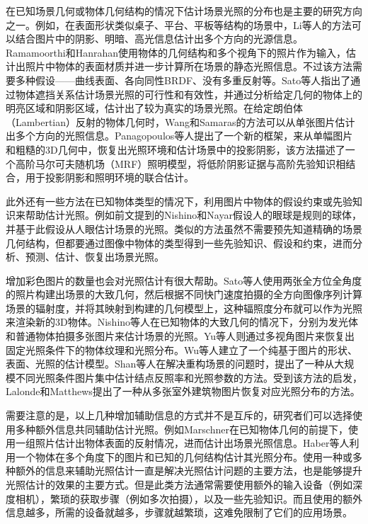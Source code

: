 
在已知场景几何或物体几何结构的情况下估计场景光照的分布也是主要的研究方向之一。例如，在表面形状类似桌子、平台、平板等结构的场景中，Li等人\cite{li2003multiple}的方法可以结合图片中的阴影、明暗、高光信息估计出多个方向的光源信息。Ramamoorthi和Hanrahan\cite{ramamoorthi2001signal}使用物体的几何结构和多个视角下的照片作为输入，估计出照片中物体的表面材质并进一步计算所在场景的静态光照信息。不过该方法需要多种假设——曲线表面、各向同性BRDF、没有多重反射等。Sato等人\cite{sato2003illumination}指出了通过物体遮挡关系估计场景光照的可行性和有效性，并通过分析给定几何的物体上的明亮区域和阴影区域，估计出了较为真实的场景光照。在给定朗伯体（Lambertian）反射的物体几何时，Wang和Samaras\cite{wang2002estimation}的方法可以从单张图片估计出多个方向的光照信息。Panagopoulos等人\cite{panagopoulos2011illumination}提出了一个新的框架，来从单幅图片和粗糙的3D几何中，恢复出光照环境和估计场景中的投影阴影，该方法描述了一个高阶马尔可夫随机场（MRF）照明模型，将低阶阴影证据与高阶先验知识相结合，用于投影阴影和照明环境的联合估计。

此外还有一些方法在已知物体类型的情况下，利用图片中物体的假设约束或先验知识来帮助估计光照。例如前文提到的Nishino和Nayar\cite{nishino2004eyes}假设人的眼球是规则的球体，并基于此假设从人眼估计场景的光照。类似的方法\cite{barron2015shape, lopez2010compositing}虽然不需要预先知道精确的场景几何结构，但都要通过图像中物体的类型得到一些先验知识、假设和约束，进而分析、预测、估计、恢复出场景光照。

增加彩色图片的数量也会对光照估计有很大帮助。Sato等人\cite{sato1999acquiring}使用两张全方位全角度的照片构建出场景的大致几何，然后根据不同快门速度拍摄的全方向图像序列计算场景的辐射度，并将其映射到构建的几何模型上，这种辐照度分布就可以作为光照来渲染新的3D物体。Nishino等人\cite{nishino2001determining, nishino2005re}在已知物体的大致几何的情况下，分别为发光体和普通物体拍摄多张图片来估计场景的光照。Yu等人\cite{yu2006sparse}则通过多视角图片来恢复出固定光照条件下的物体纹理和光照分布。Wu等人\cite{wu2011high}建立了一个纯基于图片的形状、表面、光照的估计模型。Shan等人\cite{shan2013visual}在解决重构场景的问题时，提出了一种从大规模不同光照条件图片集中估计结点反照率和光照参数的方法。受到该方法的启发，Lalonde和Matthews\cite{lalonde2014lighting}提出了一种从多张室外建筑物图片恢复对应光照分布的方法。

需要注意的是，以上几种增加辅助信息的方式并不是互斥的，研究者们可以选择使用多种额外信息共同辅助估计光照。例如Marschner\cite{marschner1997inverse}在已知物体几何的前提下，使用一组照片估计出物体表面的反射情况，进而估计出场景光照信息。Haber等人\cite{haber2009relighting}利用一个物体在多个角度下的图片和已知的几何结构估计其光照分布。使用一种或多种额外的信息来辅助光照估计一直是解决光照估计问题的主要方法，也是能够提升光照估计的效果的主要方式。但是此类方法通常需要使用额外的输入设备（例如深度相机），繁琐的获取步骤（例如多次拍摄），以及一些先验知识。而且使用的额外信息越多，所需的设备就越多，步骤就越繁琐，这难免限制了它们的应用场景。


